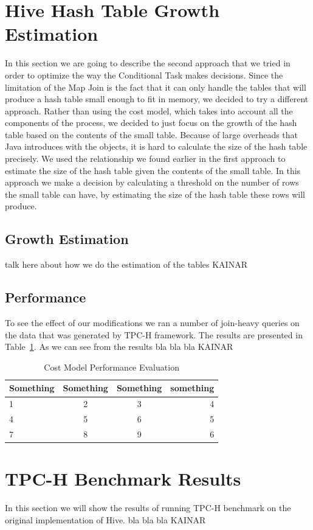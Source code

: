 \documentclass[11 pt ]{article}
\begin{document}
\section{Hive Hash Table Growth Estimation}
In this section we are going to describe the second approach that we tried in order to optimize the way the Conditional Task makes decisions. Since the limitation of the Map Join is the fact that it can only handle the tables that will produce a hash table small enough to fit in memory, we decided to try a different approach. Rather than using the cost model, which takes into account all the components of the process, we decided to just focus on the growth of the hash table based on the contents of the small table. Because of large overheads that Java introduces with the objects, it is hard to calculate the size of the hash table precisely. We used the relationship we found earlier in the first approach to estimate the size of the hash table given the contents of the small table. In this approach we make a decision by calculating a threshold on the number of rows the small table can have, by estimating the size of the hash table these rows will produce.

\subsection{Growth Estimation}
talk here about how we do the estimation of the tables KAINAR
\subsection{Performance}
To see the effect of our modifications we ran a number of join-heavy queries on the data that was generated by TPC-H framework. The results are presented in Table~\ref{tab:hashtable-table}. As we can see from the results bla bla bla KAINAR
\begin{table}
\centering
\begin{tabular}{ | l | c | c | r |}
  \hline                        
  Something & Something & Something & something \\
  \hline
  1 & 2 & 3 & 4\\
    \hline	
  4 & 5 & 6 & 5\\
    \hline
  7 & 8 & 9 & 6\\
  \hline  
\end{tabular}
\caption{Cost Model Performance Evaluation}
\label{tab:hashtable-table}
\end{table}
\section{TPC-H Benchmark Results}
In this section we will show the results of running TPC-H benchmark on the original implementation of Hive. 
bla bla bla KAINAR
\end{document}
